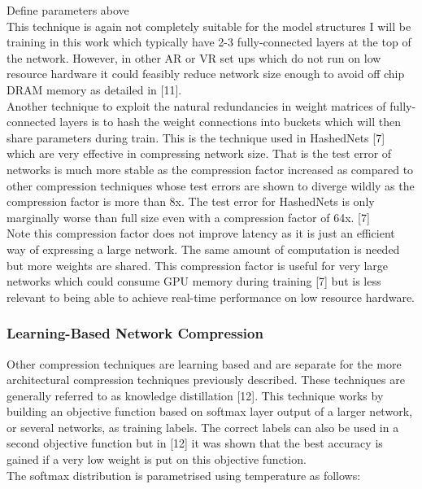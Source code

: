 \documentclass{article}
\begin{document}
Define parameters above\\

This technique is again not completely suitable for the model structures I will be training in this work which typically have 2-3 fully-connected layers at the top of the network. However, in other AR or VR set ups which do not run on low resource hardware it could feasibly reduce network size enough to avoid off chip DRAM memory as detailed in [11]. \\

Another technique to exploit the natural redundancies in weight matrices of fully-connected layers is to hash the weight connections into buckets which will then share parameters during train. This is the technique used in HashedNets [7] which are very effective in compressing network size. That is the test error of networks is much more stable as the compression factor increased as compared to other compression techniques whose test errors are shown to diverge wildly as the compression factor is more than 8x. The test error for HashedNets is only marginally worse than full size even with a compression factor of 64x. [7]\\

Note this compression factor does not improve latency as it is just an efficient way of expressing a large network. The same amount of computation is needed but more weights are shared. This compression factor is useful for very large networks which could consume GPU memory during training [7] but is less relevant to being able to achieve real-time performance on low resource hardware. 

\subsubsection{Learning-Based Network Compression}
Other compression techniques are learning based and are separate for the more architectural compression techniques previously described. These techniques are generally referred to as knowledge distillation [12]. This technique works by building an objective function based on softmax layer output of a larger network, or several networks, as training labels. The correct labels can also be used in a second objective function but in [12] it was shown that the best accuracy is gained if a very low weight is put on this objective function.\\

The softmax distribution is parametrised using temperature as follows:
\end{document}
